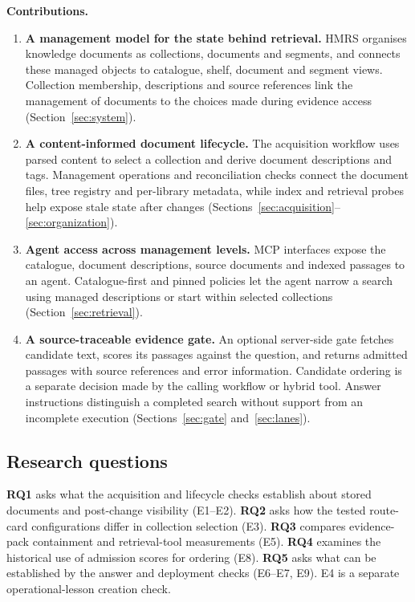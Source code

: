 \noindent\textbf{Contributions.}
\begin{enumerate}
\item \textbf{A management model for the state behind retrieval.} HMRS
organises knowledge documents as collections, documents and segments, and
connects these managed objects to catalogue, shelf, document and segment
views. Collection membership, descriptions and source references link the
management of documents to the choices made during evidence access
(Section~\ref{sec:system}).
\item \textbf{A content-informed document lifecycle.} The acquisition
workflow uses parsed content to select a collection and derive document
descriptions and tags. Management operations and reconciliation checks
connect the document files, tree registry and per-library metadata, while
index and retrieval probes help expose stale state after changes
(Sections~\ref{sec:acquisition}--\ref{sec:organization}).
\item \textbf{Agent access across management levels.} MCP interfaces expose
the catalogue, document descriptions, source documents and indexed passages
to an agent. Catalogue-first and pinned policies let the agent narrow a
search using managed descriptions or start within selected collections
(Section~\ref{sec:retrieval}).
\item \textbf{A source-traceable evidence gate.} An optional server-side
gate fetches candidate text, scores its passages against the question, and
returns admitted passages with source references and error information.
Candidate ordering is a separate decision made by the calling workflow or
hybrid tool. Answer instructions distinguish a completed search without
support from an incomplete execution
(Sections~\ref{sec:gate} and~\ref{sec:lanes}).
\end{enumerate}

\subsection{Research questions}
\label{sec:rq}

\textbf{RQ1} asks what the acquisition and lifecycle checks establish about
stored documents and post-change visibility (E1--E2). \textbf{RQ2} asks how
the tested route-card configurations differ in collection selection (E3).
\textbf{RQ3} compares evidence-pack containment and retrieval-tool measurements
(E5). \textbf{RQ4} examines the historical use of admission scores for ordering
(E8). \textbf{RQ5} asks what can be established by the answer and deployment
checks (E6--E7, E9). E4 is a separate operational-lesson creation check.
